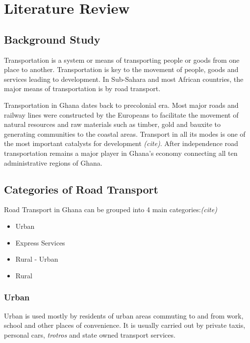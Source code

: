 
\chapter{Literature Review} %



\section{Background Study}
Transportation is a system or means of transporting people or goods from one place to another. Transportation is key to the movement of people, goods and services leading to development. In Sub-Sahara and most African countries, the major means of transportation is by road transport.

Transportation in Ghana dates back to precolonial era. Most major roads and railway lines were constructed by the Europeans to facilitate the movement of natural resources and raw materials such as timber, gold and bauxite to generating communities to the coastal areas. Transport in all its modes is one of the most important catalysts for development \textit{(cite)}. %
After independence road transportation remains a major player in Ghana's economy connecting all ten administrative regions of Ghana. 

\section{Categories of Road Transport}
Road Transport in Ghana can be grouped into 4 main categories:\textit{(cite)}
\begin{itemize}
	\item Urban
	\item Express Services
	\item Rural - Urban
	\item Rural
\end{itemize}

\subsection{Urban}
Urban is used mostly by residents of urban areas commuting to and from work, school and other places of convenience. It is usually carried out by private taxis, personal cars, \textit{trotros} and state owned transport services.

